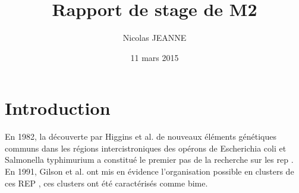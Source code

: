 \documentclass[12pt,a4paper]{report}
\author{Nicolas JEANNE}
\title{Rapport de stage de M2}
\date{11 mars 2015}
\begin{document}
\maketitle




\section*{Introduction}

En 1982, la découverte par Higgins et al. de nouveaux éléments génétiques communs dans les régions intercistroniques des opérons de Escherichia coli et Salmonella typhimurium a constitué le premier pas de la recherche sur les \gls{rep} \citep{Higgins1982}. En 1991, Gilson et al. ont mis en évidence l'organisation possible en clusters de ces REP \citep{Gilson1991}, ces clusters ont été caractérisés comme \gls{bime}.



 
\printglossary[type=\acronymtype ,title=Abbreviations]



\end{document}
